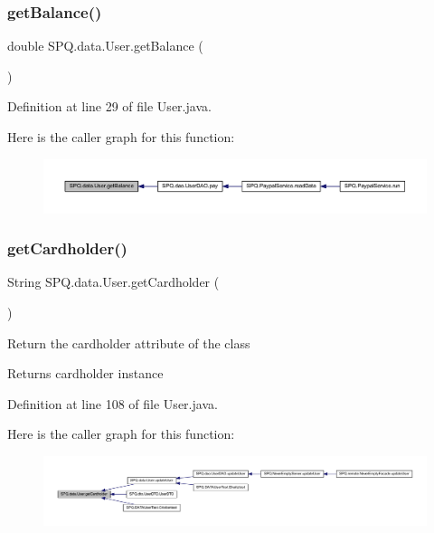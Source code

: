 \subsubsection{\texorpdfstring{get\+Balance()}{getBalance()}}
{\footnotesize\ttfamily double S\+P\+Q.\+data.\+User.\+get\+Balance (\begin{DoxyParamCaption}{ }\end{DoxyParamCaption})}



Definition at line 29 of file User.\+java.

Here is the caller graph for this function\+:\nopagebreak
\begin{figure}[H]
\begin{center}
\leavevmode
\includegraphics[width=350pt]{class_s_p_q_1_1data_1_1_user_a03cc880edbf4758b44318af1587824e5_icgraph}
\end{center}
\end{figure}
\mbox{\label{class_s_p_q_1_1data_1_1_user_a6184a8aa1ccfc02796356f648ebf37ee}} 
\subsubsection{\texorpdfstring{get\+Cardholder()}{getCardholder()}}
{\footnotesize\ttfamily String S\+P\+Q.\+data.\+User.\+get\+Cardholder (\begin{DoxyParamCaption}{ }\end{DoxyParamCaption})}

Return the cardholder attribute of the class \begin{DoxyReturn}{Returns}
cardholder instance 
\end{DoxyReturn}


Definition at line 108 of file User.\+java.

Here is the caller graph for this function\+:\nopagebreak
\begin{figure}[H]
\begin{center}
\leavevmode
\includegraphics[width=350pt]{class_s_p_q_1_1data_1_1_user_a6184a8aa1ccfc02796356f648ebf37ee_icgraph}
\end{center}
\end{figure}
\mbox{\label{class_s_p_q_1_1data_1_1_user_ab847d5c61fe4980ae2a15a537b22939b}} 
